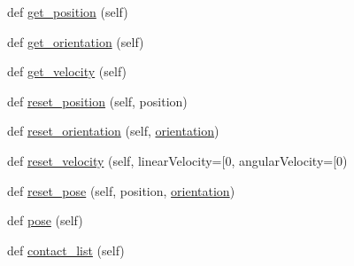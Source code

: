 \begin{DoxyCompactItemize}
\item 
def \hyperlink{classpybullet-gym_1_1pybulletgym_1_1envs_1_1mujoco_1_1robots_1_1robot__bases_1_1_body_part_afa6a952d30034016a1139740cb571c30}{get\+\_\+position} (self)
\item 
def \hyperlink{classpybullet-gym_1_1pybulletgym_1_1envs_1_1mujoco_1_1robots_1_1robot__bases_1_1_body_part_a3aaedbc0660968233ec503310d2cd8b9}{get\+\_\+orientation} (self)
\item 
def \hyperlink{classpybullet-gym_1_1pybulletgym_1_1envs_1_1mujoco_1_1robots_1_1robot__bases_1_1_body_part_a389f0a159039a74a869ff1accd006142}{get\+\_\+velocity} (self)
\item 
def \hyperlink{classpybullet-gym_1_1pybulletgym_1_1envs_1_1mujoco_1_1robots_1_1robot__bases_1_1_body_part_a40905f8b4c52880224c7600bc7c5ab5a}{reset\+\_\+position} (self, position)
\item 
def \hyperlink{classpybullet-gym_1_1pybulletgym_1_1envs_1_1mujoco_1_1robots_1_1robot__bases_1_1_body_part_afafdaf6e9668a67b1d4e2bc4d289badc}{reset\+\_\+orientation} (self, \hyperlink{namespacepybullet-gym_1_1pybulletgym_1_1envs_1_1mujoco_1_1robots_1_1robot__bases_a43c43149f85e8e7a4ac1b66c78f6290f}{orientation})
\item 
def \hyperlink{classpybullet-gym_1_1pybulletgym_1_1envs_1_1mujoco_1_1robots_1_1robot__bases_1_1_body_part_a7f1bc37cdc6aef9edd752c5644df2595}{reset\+\_\+velocity} (self, linear\+Velocity=\mbox{[}0, angular\+Velocity=\mbox{[}0)
\item 
def \hyperlink{classpybullet-gym_1_1pybulletgym_1_1envs_1_1mujoco_1_1robots_1_1robot__bases_1_1_body_part_a53560318df15eec2b11bfe99800ba384}{reset\+\_\+pose} (self, position, \hyperlink{namespacepybullet-gym_1_1pybulletgym_1_1envs_1_1mujoco_1_1robots_1_1robot__bases_a43c43149f85e8e7a4ac1b66c78f6290f}{orientation})
\item 
def \hyperlink{classpybullet-gym_1_1pybulletgym_1_1envs_1_1mujoco_1_1robots_1_1robot__bases_1_1_body_part_a3a5bcfbb183699427da4fffb68a70c1e}{pose} (self)
\item 
def \hyperlink{classpybullet-gym_1_1pybulletgym_1_1envs_1_1mujoco_1_1robots_1_1robot__bases_1_1_body_part_a31d81e379acb26c0946fad888cdb2119}{contact\+\_\+list} (self)
\end{DoxyCompactItemize}
